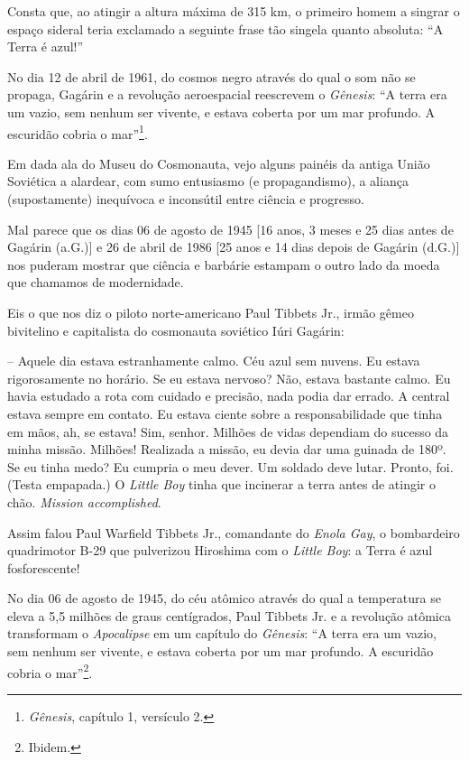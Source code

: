 Consta que, ao atingir a altura máxima de 315 km, o primeiro homem a
singrar o espaço sideral teria exclamado a seguinte frase tão singela
quanto absoluta: ``A Terra é azul!''

No dia 12 de abril de 1961, do cosmos negro através do qual o som não se
propaga, Gagárin e a revolução aeroespacial reescrevem o \emph{Gênesis}:
``A terra era um vazio, sem nenhum ser vivente, e estava coberta por um
mar profundo. A escuridão cobria o mar''\footnote{\emph{Gênesis},
  capítulo 1, versículo 2.}.

Em dada ala do Museu do Cosmonauta, vejo alguns painéis da antiga União
Soviética a alardear, com sumo entusiasmo (e propagandismo), a aliança
(supostamente) inequívoca e inconsútil entre ciência e progresso.

Mal parece que os dias 06 de agosto de 1945 {[}16 anos, 3 meses e 25
dias antes de Gagárin (a.G.){]} e 26 de abril de 1986 {[}25 anos e 14
dias depois de Gagárin (d.G.){]} nos puderam mostrar que ciência e
barbárie estampam o outro lado da moeda que chamamos de modernidade.

Eis o que nos diz o piloto norte-americano Paul Tibbets Jr., irmão gêmeo
bivitelino e capitalista do cosmonauta soviético Iúri Gagárin:

-- Aquele dia estava estranhamente calmo. Céu azul sem nuvens. Eu estava
rigorosamente no horário. Se eu estava nervoso? Não, estava bastante
calmo. Eu havia estudado a rota com cuidado e precisão, nada podia dar
errado. A central estava sempre em contato. Eu estava ciente sobre a
responsabilidade que tinha em mãos, ah, se estava! Sim, senhor. Milhões
de vidas dependiam do sucesso da minha missão. Milhões! Realizada a
missão, eu devia dar uma guinada de 180º. Se eu tinha medo? Eu cumpria o
meu dever. Um soldado deve lutar. Pronto, foi. (Testa empapada.) O
\emph{Little Boy} tinha que incinerar a terra antes de atingir o chão.
\emph{Mission accomplished}.

Assim falou Paul Warfield Tibbets Jr., comandante do \emph{Enola Gay}, o
bombardeiro quadrimotor B-29 que pulverizou Hiroshima com o \emph{Little
Boy}: a Terra é azul fosforescente!

No dia 06 de agosto de 1945, do céu atômico através do qual a
temperatura se eleva a 5,5 milhões de graus centígrados, Paul Tibbets
Jr. e a revolução atômica transformam o \emph{Apocalipse} em um capítulo
do \emph{Gênesis}: ``A terra era um vazio, sem nenhum ser vivente, e
estava coberta por um mar profundo. A escuridão cobria o mar''\footnote{Ibidem.}.

